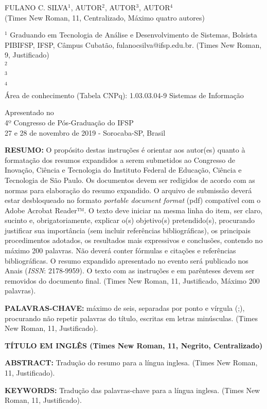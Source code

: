 \documentclass[article,11pt]{abntex2}
\begin{document}
	\begin{center}FULANO C. SILVA$^1$, AUTOR$^2$, AUTOR$^3$, AUTOR$^4$\\
	(Times New Roman, 11, Centralizado, Máximo quatro autores)\end{center}
	{\footnotesize $^1$ Graduando em Tecnologia de Análise e Desenvolvimento de Sistemas, Bolsista PIBIFSP, IFSP, Câmpus Cubatão, fulanocsilva@ifsp.edu.br. (Times New Roman, 9, Justificado)\\
	$^2$ \\
	$^3$ \\
	$^4$ \\
	Área de conhecimento (Tabela CNPq): 1.03.03.04-9 Sistemas de Informação}
	\begin{center}
		Apresentado no\\
		4º Congresso de Pós-Graduação do IFSP\\
		27 e 28 de novembro de 2019 - Sorocaba-SP, Brasil
	\end{center}
	\noindent\textbf{RESUMO:} O propósito destas instruções é orientar aos autor(es) quanto à formatação dos resumos expandidos a serem submetidos ao Congresso de Inovação, Ciência e Tecnologia do Instituto Federal de Educação, Ciência e Tecnologia de São Paulo. Os documentos devem ser redigidos de acordo com as normas para elaboração do resumo expandido. O arquivo de submissão deverá estar desbloqueado no formato \emph{portable document format} (pdf) compatível com o Adobe Acrobat Reader™. O texto deve iniciar na mesma linha do item, ser claro, sucinto e, obrigatoriamente, explicar o(s) objetivo(s) pretendido(s), procurando justificar sua importância (sem incluir referências bibliográficas), os principais procedimentos adotados, os resultados mais expressivos e conclusões, contendo no máximo 200 palavras. Não deverá conter fórmulas e citações e referências bibliográficas. O resumo expandido apresentado no evento será publicado nos Anais (\textit{ISSN}: 2178-9959). O texto com as instruções e em parênteses devem ser removidos do documento final. (Times New Roman, 11, Justificado, Máximo 200 palavras).\par
	\bigskip\noindent\textbf{PALAVRAS-CHAVE:} máximo de seis, separadas por ponto e vírgula (;), procurando não repetir palavras do título, escritas em letras minúsculas. (Times New Roman, 11, Justificado).\par
	
	\begin{center}{\bfseries TÍTULO EM INGLÊS (Times New Roman, 11, Negrito, Centralizado)}\end{center}
	\noindent\textbf{ABSTRACT:} Tradução do resumo para a língua inglesa. (Times New Roman, 11, Justificado).\par
	\bigskip\noindent\textbf{KEYWORDS:} Tradução das palavras-chave para a língua inglesa. (Times New Roman, 11, Justificado).\par
	
\end{document}
